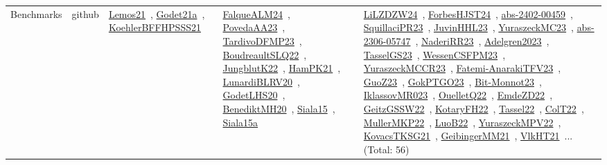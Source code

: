 {\begin{longtable}{lp{3cm}>{\raggedright\arraybackslash}p{6cm}>{\raggedright\arraybackslash}p{6cm}>{\raggedright\arraybackslash}p{8cm}}
\index{github}\index{Benchmarks!github}Benchmarks & github & \href{../works/Lemos21.pdf}{Lemos21}~\cite{Lemos21}, \href{../works/Godet21a.pdf}{Godet21a}~\cite{Godet21a}, \href{../works/KoehlerBFFHPSSS21.pdf}{KoehlerBFFHPSSS21}~\cite{KoehlerBFFHPSSS21} & \href{../works/FalqueALM24.pdf}{FalqueALM24}~\cite{FalqueALM24}, \href{../works/PovedaAA23.pdf}{PovedaAA23}~\cite{PovedaAA23}, \href{../works/TardivoDFMP23.pdf}{TardivoDFMP23}~\cite{TardivoDFMP23}, \href{../works/BoudreaultSLQ22.pdf}{BoudreaultSLQ22}~\cite{BoudreaultSLQ22}, \href{../works/JungblutK22.pdf}{JungblutK22}~\cite{JungblutK22}, \href{../works/HamPK21.pdf}{HamPK21}~\cite{HamPK21}, \href{../works/LunardiBLRV20.pdf}{LunardiBLRV20}~\cite{LunardiBLRV20}, \href{../works/GodetLHS20.pdf}{GodetLHS20}~\cite{GodetLHS20}, \href{../works/BenediktMH20.pdf}{BenediktMH20}~\cite{BenediktMH20}, \href{../works/Siala15.pdf}{Siala15}~\cite{Siala15}, \href{../works/Siala15a.pdf}{Siala15a}~\cite{Siala15a} & \href{../works/LiLZDZW24.pdf}{LiLZDZW24}~\cite{LiLZDZW24}, \href{../works/ForbesHJST24.pdf}{ForbesHJST24}~\cite{ForbesHJST24}, \href{../works/abs-2402-00459.pdf}{abs-2402-00459}~\cite{abs-2402-00459}, \href{../works/SquillaciPR23.pdf}{SquillaciPR23}~\cite{SquillaciPR23}, \href{../works/JuvinHHL23.pdf}{JuvinHHL23}~\cite{JuvinHHL23}, \href{../works/YuraszeckMC23.pdf}{YuraszeckMC23}~\cite{YuraszeckMC23}, \href{../works/abs-2306-05747.pdf}{abs-2306-05747}~\cite{abs-2306-05747}, \href{../works/NaderiRR23.pdf}{NaderiRR23}~\cite{NaderiRR23}, \href{../works/Adelgren2023.pdf}{Adelgren2023}~\cite{Adelgren2023}, \href{../works/TasselGS23.pdf}{TasselGS23}~\cite{TasselGS23}, \href{../works/WessenCSFPM23.pdf}{WessenCSFPM23}~\cite{WessenCSFPM23}, \href{../works/YuraszeckMCCR23.pdf}{YuraszeckMCCR23}~\cite{YuraszeckMCCR23}, \href{../works/Fatemi-AnarakiTFV23.pdf}{Fatemi-AnarakiTFV23}~\cite{Fatemi-AnarakiTFV23}, \href{../works/GuoZ23.pdf}{GuoZ23}~\cite{GuoZ23}, \href{../works/GokPTGO23.pdf}{GokPTGO23}~\cite{GokPTGO23}, \href{../works/Bit-Monnot23.pdf}{Bit-Monnot23}~\cite{Bit-Monnot23}, \href{../works/IklassovMR023.pdf}{IklassovMR023}~\cite{IklassovMR023}, \href{../works/OuelletQ22.pdf}{OuelletQ22}~\cite{OuelletQ22}, \href{../works/EmdeZD22.pdf}{EmdeZD22}~\cite{EmdeZD22}, \href{../works/GeitzGSSW22.pdf}{GeitzGSSW22}~\cite{GeitzGSSW22}, \href{../works/KotaryFH22.pdf}{KotaryFH22}~\cite{KotaryFH22}, \href{../works/Tassel22.pdf}{Tassel22}~\cite{Tassel22}, \href{../works/ColT22.pdf}{ColT22}~\cite{ColT22}, \href{../works/MullerMKP22.pdf}{MullerMKP22}~\cite{MullerMKP22}, \href{../works/LuoB22.pdf}{LuoB22}~\cite{LuoB22}, \href{../works/YuraszeckMPV22.pdf}{YuraszeckMPV22}~\cite{YuraszeckMPV22}, \href{../works/KovacsTKSG21.pdf}{KovacsTKSG21}~\cite{KovacsTKSG21}, \href{../works/GeibingerMM21.pdf}{GeibingerMM21}~\cite{GeibingerMM21}, \href{../works/VlkHT21.pdf}{VlkHT21}~\cite{VlkHT21}... (Total: 56)\\

\end{longtable}}
